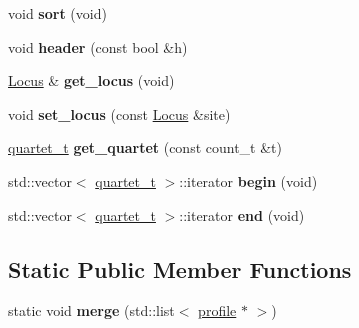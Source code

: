 \begin{DoxyCompactItemize}
\item 
\hypertarget{classprofile_acedf2b55cee28e81c3c44d41ecb51eca}{void {\bfseries sort} (void)}\label{classprofile_acedf2b55cee28e81c3c44d41ecb51eca}

\item 
\hypertarget{classprofile_a12bf8dd308350aba598506d9c4e68212}{void {\bfseries header} (const bool \&h)}\label{classprofile_a12bf8dd308350aba598506d9c4e68212}

\item 
\hypertarget{classprofile_ae492f3ad1b510800f48b5f5b3193727c}{\hyperlink{classLocus}{Locus} \& {\bfseries get\-\_\-locus} (void)}\label{classprofile_ae492f3ad1b510800f48b5f5b3193727c}

\item 
\hypertarget{classprofile_a0a56dc1b9c8a5091015217d93a72e180}{void {\bfseries set\-\_\-locus} (const \hyperlink{classLocus}{Locus} \&site)}\label{classprofile_a0a56dc1b9c8a5091015217d93a72e180}

\item 
\hypertarget{classprofile_a28853d0046d43a4a82067ffb225b039a}{\hyperlink{structquartet}{quartet\-\_\-t} {\bfseries get\-\_\-quartet} (const count\-\_\-t \&t)}\label{classprofile_a28853d0046d43a4a82067ffb225b039a}

\item 
\hypertarget{classprofile_a075e3dfdf9550243f974bdf296b84c81}{std\-::vector$<$ \hyperlink{structquartet}{quartet\-\_\-t} $>$\-::iterator {\bfseries begin} (void)}\label{classprofile_a075e3dfdf9550243f974bdf296b84c81}

\item 
\hypertarget{classprofile_a5a833f4d840a4afc764602ee11a5f905}{std\-::vector$<$ \hyperlink{structquartet}{quartet\-\_\-t} $>$\-::iterator {\bfseries end} (void)}\label{classprofile_a5a833f4d840a4afc764602ee11a5f905}

\end{DoxyCompactItemize}
\subsection*{Static Public Member Functions}
\begin{DoxyCompactItemize}
\item 
\hypertarget{classprofile_afcb4eaf9094258e1399ded1386caa73e}{static void {\bfseries merge} (std\-::list$<$ \hyperlink{classprofile}{profile} $\ast$ $>$)}\label{classprofile_afcb4eaf9094258e1399ded1386caa73e}

\end{DoxyCompactItemize}
